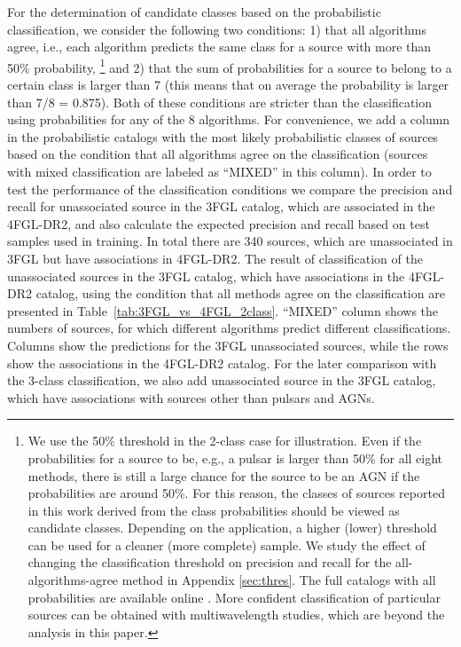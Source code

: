 For the determination of candidate classes based on the probabilistic classification, we consider the following two conditions:
1) that all algorithms agree, i.e., each algorithm predicts the same class for a source with more than 50\% probability,%
\footnote{We use the 50\% threshold in the 2-class case for illustration. Even if the probabilities for a source to be, e.g., a pulsar is larger than 50\% for all eight methods, there is still a large chance for the source to be an AGN if the probabilities are around 50\%. 
For this reason, the classes of sources reported in this work derived from the class probabilities should be viewed as candidate classes.
Depending on the application, a higher (lower) threshold can be used for a cleaner (more complete) sample. 
We study the effect of changing the classification threshold on precision and recall for the all-algorithms-agree method in 
Appendix \ref{sec:thres}.
The full catalogs with all probabilities are available online \citep{SOM_material}.
More confident classification of particular sources can be obtained with multiwavelength studies, 
which are beyond the analysis in this paper.}
 and 
2) that the sum of probabilities for a source to belong to a certain class is larger than 7 
(this means that on average the probability is larger than 7/8 = 0.875).
Both of these conditions are stricter than the classification using probabilities for any of the 8 algorithms.
For convenience, we add a column in the probabilistic catalogs with the most likely probabilistic classes of sources based on the condition that all algorithms agree on the classification (sources with mixed classification are labeled as ``MIXED'' in this column).
In order to test the performance of the classification conditions we compare the precision and recall for unassociated source in the 3FGL catalog, which are associated in the 4FGL-DR2, and also calculate the expected precision and recall based on
test samples used in training.
In total there are 340 sources, which are unassociated in 3FGL but have associations in 4FGL-DR2.
The result of classification of the unassociated sources in the 3FGL catalog, which have associations in the 4FGL-DR2 catalog, 
using the condition that all methods agree on the classification are presented in Table~\ref{tab:3FGL_vs_4FGL_2class}.
``MIXED'' column shows the numbers of sources, for which different algorithms predict different classifications.
Columns show the predictions for the 3FGL unassociated sources, while the rows show the associations in the 4FGL-DR2 catalog.
For the later comparison with the 3-class classification, we also add unassociated source in the 3FGL catalog, 
which have associations with sources other than pulsars and AGNs.

